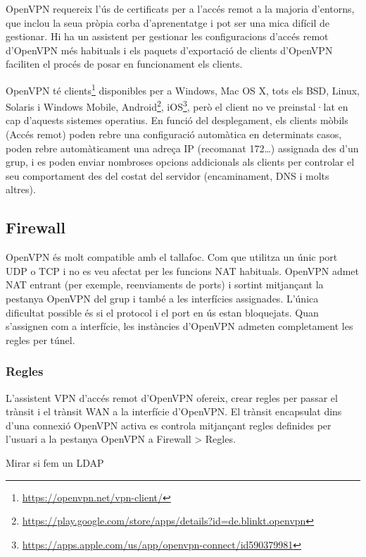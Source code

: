 \documentclass[
  10pt,
]{krantz}
\DeclareRobustCommand{\href}[2]{#2\footnote{\url{#1}}}
\begin{document}
OpenVPN requereix l'ús de certificats per a l'accés remot a la majoria d'entorns, que inclou la seua pròpia corba d'aprenentatge i pot ser una mica difícil de gestionar. Hi ha un assistent per gestionar les configuracions d'accés remot d'OpenVPN més habituals i els paquets d'exportació de clients d'OpenVPN faciliten el procés de posar en funcionament els clients.

OpenVPN té \href{https://openvpn.net/vpn-client/}{clients} disponibles per a Windows, Mac OS X, tots els BSD, Linux, Solaris i Windows Mobile, \href{https://play.google.com/store/apps/details?id=de.blinkt.openvpn}{Android}, \href{https://apps.apple.com/us/app/openvpn-connect/id590379981}{iOS}, però el client no ve preinstal·lat en cap d'aquests sistemes operatius. En funció del desplegament, els clients mòbils (Accés remot) poden rebre una configuració automàtica en determinats casos, poden rebre automàticament una adreça IP (recomanat 172\ldots) assignada des d'un grup, i es poden enviar nombroses opcions addicionals als clients per controlar el seu comportament des del costat del servidor (encaminament, DNS i molts altres).

\hypertarget{firewall}{%
\subsection{Firewall}\label{firewall}}

OpenVPN és molt compatible amb el tallafoc. Com que utilitza un únic port UDP o TCP i no es veu afectat per les funcions NAT habituals. OpenVPN admet NAT entrant (per exemple, reenviaments de ports) i sortint mitjançant la pestanya OpenVPN del grup i també a les interfícies assignades. L'única dificultat possible és si el protocol i el port en ús estan bloquejats. Quan s'assignen com a interfície, les instàncies d'OpenVPN admeten completament les regles per túnel.

\hypertarget{regles}{%
\subsubsection{Regles}\label{regles}}

L'assistent VPN d'accés remot d'OpenVPN ofereix, crear regles per passar el trànsit i el trànsit WAN a la interfície d'OpenVPN. El trànsit encapsulat dins d'una connexió OpenVPN activa es controla mitjançant regles definides per l'usuari a la pestanya OpenVPN a Firewall \textgreater{} Regles.

Mirar si fem un LDAP
\end{document}
